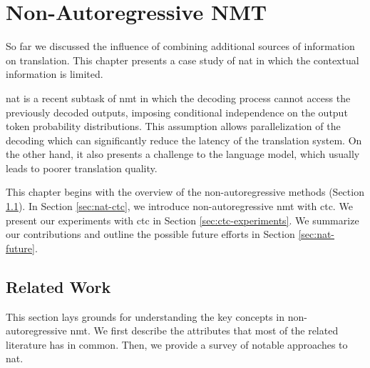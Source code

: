 \chapter{Non-Autoregressive NMT}
\label{chap:nat}

So far we discussed the influence of combining additional sources of information
on translation. This chapter presents a case study of \gls{nat} in which the
contextual information is limited.

\gls{nat} is a recent subtask of \gls{nmt} in which the decoding process cannot
access the previously decoded outputs, imposing conditional independence on the
output token probability distributions. This assumption allows parallelization
of the decoding which can significantly reduce the latency of the translation
system. On the other hand, it also presents a challenge to the language model,
which usually leads to poorer translation quality.

This chapter begins with the overview of the non-autoregressive methods (Section
\ref{sec:nat-methods}). In Section \ref{sec:nat-ctc}, we introduce
non-autoregressive \gls{nmt} with \gls{ctc}. We present our experiments with
\gls{ctc} in Section \ref{sec:ctc-experiments}. We summarize our contributions
and outline the possible future efforts in Section \ref{sec:nat-future}.


\section{Related Work}
\label{sec:nat-methods}

This section lays grounds for understanding the key concepts in
non-autoregressive \gls{nmt}. We first describe the attributes that most of the
related literature has in common. Then, we provide a survey of notable
approaches to \gls{nat}.


